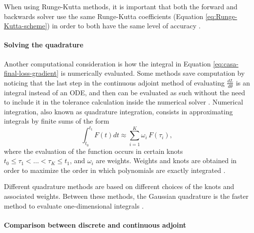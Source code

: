 When using Runge-Kutta methods, it is important that both the forward and backwards solver use the same Runge-Kutta coefficients (Equation \eqref{eq:Runge-Kutta-scheme}) in order to both have the same level of accuracy \cite{Alexe_Sandu_2009}.

\paragraph{Solving the quadrature}

Another computational consideration is how the integral in Equation \eqref{eq:casa-final-loss-gradient} is numerically evaluated. 
Some methods save computation by noticing that the last step in the continuous adjoint method of evaluating $\frac{dL}{d\theta}$ is an integral instead of an ODE, and then can be evaluated as such without the need to include it in the tolerance calculation inside the numerical solver \cite{that-is-not-an-ode}.
Numerical integration, also known as quadrature integration, consists in approximating integrals by finite sums of the form
\begin{equation}
    \int_{t_0}^{t_1} 
    F(t) dt
    \approx
    \sum_{i=1}^K \omega_i \, F(\tau_i),
\end{equation}
where the evaluation of the function occurs in certain knots $t_0 \leq \tau_1 < \ldots < \tau_K \leq t_1$, and $\omega_i$ are weights. 
Weights and knots are obtained in order to maximize the order in which polynomials are exactly integrated \cite{stoer2002-numerical}. 

Different quadrature methods are based on different choices of the knots and associated weights.
Between these methods, the Gaussian quadrature is the faster method to evaluate one-dimensional integrals \cite{Norcliffe_gaussquadrature_2023}.

\paragraph{Comparison between discrete and continuous adjoint}